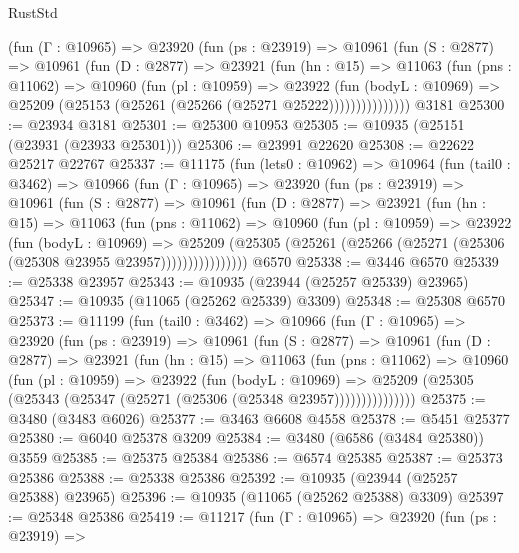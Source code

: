 \begin{lexlean}{RustStd}
\begin{coremodule}
{{{{{{{{{{{{{{{{{{{          (fun (Γ : @10965) =>
          @23920
            (fun (ps : @23919) =>
            @10961
              (fun (S : @2877) =>
              @10961
                (fun (D : @2877) =>
                @23921
                  (fun (hn : @15) =>
                  @11063
                    (fun (pns : @11062) =>
                    @10960
                      (fun (pl : @10959) =>
                      @23922
                        (fun (bodyL : @10969) =>
                        @25209 (@25153 (@25261 (@25266 (@25271 @25222)))))))))))))))
    @3181
@25300 := @23934 @3181
@25301 := @25300 @10953
@25305 := @10935 (@25151 (@23931 (@23933 @25301)))
@25306 := @23991 @22620
@25308 := @22622 @25217 @22767
@25337 := @11175
    (fun (lets0 : @10962) =>
    @10964
      (fun (tail0 : @3462) =>
      @10966
        (fun (Γ : @10965) =>
        @23920
          (fun (ps : @23919) =>
          @10961
            (fun (S : @2877) =>
            @10961
              (fun (D : @2877) =>
              @23921
                (fun (hn : @15) =>
                @11063
                  (fun (pns : @11062) =>
                  @10960
                    (fun (pl : @10959) =>
                    @23922
                      (fun (bodyL : @10969) =>
                      @25209
                        (@25305
                          (@25261 (@25266 (@25271 (@25306 (@25308 @23955 @23957))))))))))))))))
    @6570
@25338 := @3446 @6570
@25339 := @25338 @23957
@25343 := @10935 (@23944 (@25257 @25339) @23965)
@25347 := @10935 (@11065 (@25262 @25339) @3309)
@25348 := @25308 @6570
@25373 := @11199
    (fun (tail0 : @3462) =>
    @10966
      (fun (Γ : @10965) =>
      @23920
        (fun (ps : @23919) =>
        @10961
          (fun (S : @2877) =>
          @10961
            (fun (D : @2877) =>
            @23921
              (fun (hn : @15) =>
              @11063
                (fun (pns : @11062) =>
                @10960
                  (fun (pl : @10959) =>
                  @23922
                    (fun (bodyL : @10969) =>
                    @25209 (@25305 (@25343 (@25347 (@25271 (@25306 (@25348 @23957)))))))))))))))
@25375 := @3480 (@3483 @6026)
@25377 := @3463 @6608 @4558
@25378 := @5451 @25377
@25380 := @6040 @25378 @3209
@25384 := @3480 (@6586 (@3484 @25380)) @3559
@25385 := @25375 @25384
@25386 := @6574 @25385
@25387 := @25373 @25386
@25388 := @25338 @25386
@25392 := @10935 (@23944 (@25257 @25388) @23965)
@25396 := @10935 (@11065 (@25262 @25388) @3309)
@25397 := @25348 @25386
@25419 := @11217
    (fun (Γ : @10965) =>
    @23920
      (fun (ps : @23919) =>
}}}}}}}}}}}}}}}}}}}
\end{coremodule}
\end{lexlean}
